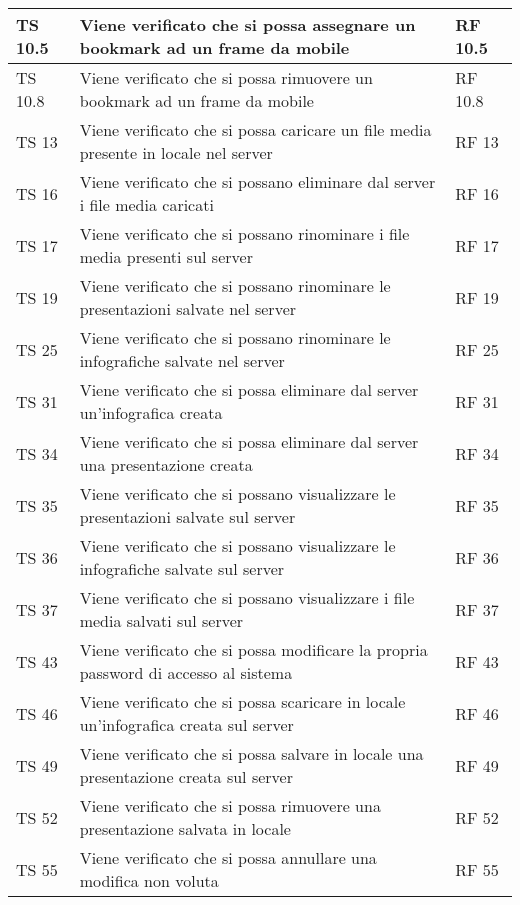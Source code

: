 {{\begin{longtable} [c]{| p{3cm} | p{6cm} |p{3cm}|}
			\hline
			TS 10.5 & Viene verificato che si possa assegnare un bookmark\ped{g} ad un frame\ped{g} da mobile & RF 10.5\\
			\hline
			TS 10.8 & Viene verificato che si possa rimuovere un bookmark\ped{g} ad un frame\ped{g} da mobile & RF 10.8\\
			\hline
			TS 13 & Viene verificato che si possa caricare un file media presente in locale nel server & RF 13\\
			\hline
			TS 16 & Viene verificato che si possano eliminare dal server\ped{g} i file media caricati & RF 16\\
			\hline
			TS 17 & Viene verificato che si possano rinominare i file media presenti sul server & RF 17\\
			\hline
			TS 19 & Viene verificato che si possano rinominare le presentazioni salvate nel server & RF 19\\
			\hline
			TS 25 & Viene verificato che si possano rinominare le infografiche salvate nel server & RF 25\\
			\hline
			TS 31 & Viene verificato che si possa eliminare dal server un'infografica creata & RF 31\\
			\hline
			TS 34 & Viene verificato che si possa eliminare dal server\ped{g} una presentazione creata & RF 34\\
			\hline
			TS 35 & Viene verificato che si possano visualizzare le presentazioni salvate sul server & RF 35\\
			\hline
			TS 36 & Viene verificato che si possano visualizzare le infografiche salvate sul server & RF 36\\
			\hline
			TS 37 & Viene verificato che si possano visualizzare i file media salvati sul server & RF 37\\						
			\hline
			TS 43 & Viene verificato che si possa modificare la propria password di accesso al sistema & RF 43\\
			\hline
			TS 46 & Viene verificato che si possa scaricare in locale un'infografica\ped{g} creata sul server\ped{g} & RF 46\\
			\hline
			TS 49 & Viene verificato che si possa salvare in locale una presentazione creata sul server\ped{g} & RF 49\\
			\hline
			TS 52 & Viene verificato che si possa rimuovere una presentazione salvata in locale & RF 52\\
			\hline
			TS 55 & Viene verificato che si possa annullare una modifica non voluta & RF 55\\

\end{longtable}}}

